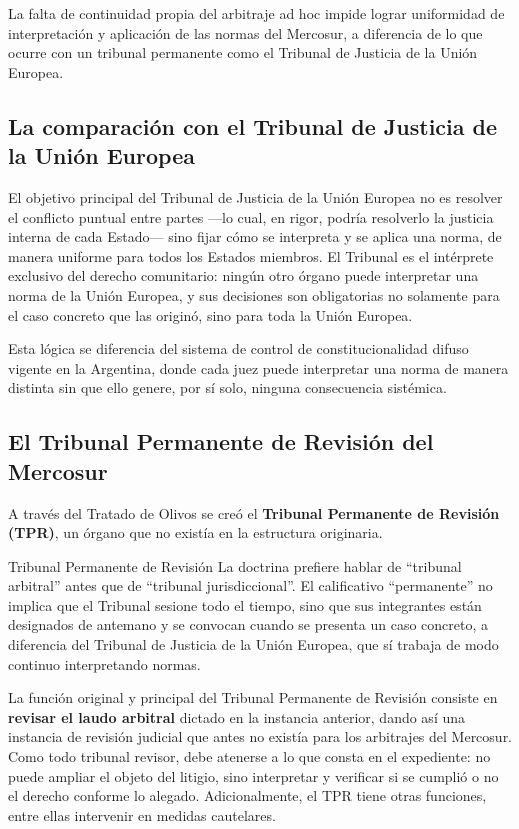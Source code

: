 \documentclass[12pt,oneside]{book}
\begin{document}
\begin{important}
La falta de continuidad propia del arbitraje ad hoc impide lograr uniformidad de interpretación y aplicación de las normas del Mercosur, a diferencia de lo que ocurre con un tribunal permanente como el Tribunal de Justicia de la Unión Europea.
\end{important}

\subsection{La comparación con el Tribunal de Justicia de la Unión Europea}

El objetivo principal del Tribunal de Justicia de la Unión Europea no es resolver el conflicto puntual entre partes —lo cual, en rigor, podría resolverlo la justicia interna de cada Estado— sino fijar cómo se interpreta y se aplica una norma, de manera uniforme para todos los Estados miembros. El Tribunal es el intérprete exclusivo del derecho comunitario: ningún otro órgano puede interpretar una norma de la Unión Europea, y sus decisiones son obligatorias no solamente para el caso concreto que las originó, sino para toda la Unión Europea.

Esta lógica se diferencia del sistema de control de constitucionalidad difuso vigente en la Argentina, donde cada juez puede interpretar una norma de manera distinta sin que ello genere, por sí solo, ninguna consecuencia sistémica.

\subsection{El Tribunal Permanente de Revisión del Mercosur}

A través del Tratado de Olivos se creó el \textbf{Tribunal Permanente de Revisión (TPR)}, un órgano que no existía en la estructura originaria.

\begin{definition}{Tribunal Permanente de Revisión}
La doctrina prefiere hablar de ``tribunal arbitral'' antes que de ``tribunal jurisdiccional''. El calificativo ``permanente'' no implica que el Tribunal sesione todo el tiempo, sino que sus integrantes están designados de antemano y se convocan cuando se presenta un caso concreto, a diferencia del Tribunal de Justicia de la Unión Europea, que sí trabaja de modo continuo interpretando normas.
\end{definition}

La función original y principal del Tribunal Permanente de Revisión consiste en \textbf{revisar el laudo arbitral} dictado en la instancia anterior, dando así una instancia de revisión judicial que antes no existía para los arbitrajes del Mercosur. Como todo tribunal revisor, debe atenerse a lo que consta en el expediente: no puede ampliar el objeto del litigio, sino interpretar y verificar si se cumplió o no el derecho conforme lo alegado. Adicionalmente, el TPR tiene otras funciones, entre ellas intervenir en medidas cautelares.
\end{document}
